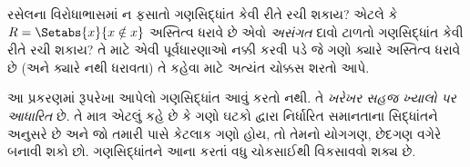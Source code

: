 \documentclass[../../../include/open-logic-section]{subfiles}
\begin{document}
\begin{digress}
રસેલના વિરોધાભાસમાં ન ફસાતો ગણસિદ્ધાંત કેવી રીતે રચી શકાય?
એટલે કે $R = \Setabs{x}{x \notin x}$ અસ્તિત્વ ધરાવે છે એવો
\emph{અસંગત} દાવો ટાળતો ગણસિદ્ધાંત કેવી રીતે રચી શકાય?
તે માટે એવી પૂર્વધારણાઓ નક્કી કરવી પડે જે ગણો ક્યારે અસ્તિત્વ ધરાવે
છે (અને ક્યારે નથી ધરાવતા) તે કહેવા માટે અત્યંત ચોક્કસ શરતો આપે.

આ પ્રકરણમાં રૂપરેખા આપેલો ગણસિદ્ધાંત આવું કરતો નથી.
તે \emph{ખરેખર સહજ ખ્યાલો પર આધારિત} છે.
તે માત્ર એટલું કહે છે કે ગણો ઘટકો દ્વારા નિર્ધારિત સમાનતાના સિદ્ધાંતને
અનુસરે છે અને જો તમારી પાસે કેટલાક ગણો હોય, તો તેમનો યોગગણ,
છેદગણ વગેરે બનાવી શકો છો.
ગણસિદ્ધાંતને આના કરતાં વધુ ચોકસાઈથી વિકસાવવો શક્ય છે.
\end{digress}
\end{document}
